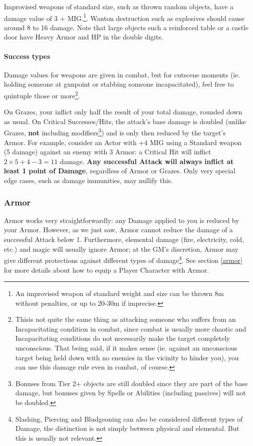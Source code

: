 Improvised weapons of standard size, such as thrown random objects, have a damage value of 3 + MIG.\footnote{An improvised weapon of standard weight and size can be thrown 8m without penalties, or up to 20-30m if imprecise.}. Wanton destruction such as explosives should cause around 8 to 16 damage. Note that large objects such a reinforced table or a castle door have Heavy Armor and HP in the double digits.

\paragraph{Success types}

Damage values for weapons are given in combat, but for cutscene moments (ie. holding someone at gunpoint or stabbing someone incapacitated), feel free to quintuple those or more\footnote{Thisis not quite the same thing as attacking someone who suffers from an Incapacitating condition in combat, since combat is usually more chaotic and Incapacitating conditions do not necessarily make the target completely unconscious. That being said, if it makes sense (ie. against an unconscious target being held down with no enemies in the vicinity to hinder you), you can use this  damage rule even in combat, of course.}.

On Grazes, your inflict only half the result of your total damage, rounded down as usual. On Critical Successes/Hits, the attack's base damage is doubled (unlike Grazes, \textbf{not} including modifiers\footnote{Bonuses from Tier 2+ objects are still doubled since they are part of the base damage, but bonuses given by Spells or Abilities (including passives) will not be doubled.}) and is only then reduced by the target's Armor. For example, consider an Actor with +4 MIG using a Standard weapon (5 damage) against an enemy with 3 Armor: a Critical Hit will inflict $2\times5+4-3 = 11$ damage. \textbf{Any successful Attack will always inflict at least 1 point of Damage}, regardless of Armor or Grazes. Only very special edge cases, such as damage immunities, may nullify this.

\subsubsection{Armor}

Armor works very straightforwardly: any Damage applied to you is reduced by your Armor. However, as we just saw, Armor cannot reduce the damage of a successful Attack below 1. Furthermore, elemental damage (fire, electricity, cold, etc.) and magic will usually ignore Armor; at the GM's discretion, Armor may give different protections against different types of damage\footnote{Slashing, Piercing and Bludgeoning can also be considered different types of Damage, the distinction is not simply between physical and elemental. But this is usually not relevant.}. See section \ref{armor} for more details about how to equip a Player Character with Armor.

